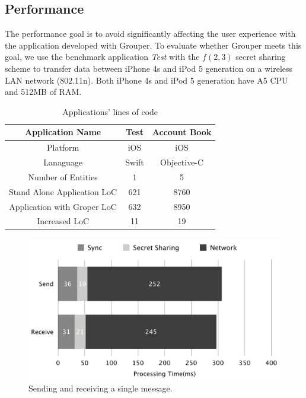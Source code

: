 \documentclass[twocolumn,10pt]{article}
\begin{document}
\subsection{Performance}

The performance goal is to avoid significantly affecting the user experience with the application developed with Grouper. 
To evaluate whether Grouper meets this goal, we use the benchmark application \emph{Test} with the $f(2, 3)$ secret sharing scheme to transfer data between iPhone 4s and iPod 5 generation on a wireless LAN network (802.11n). 
Both iPhone 4s and iPod 5 generation have A5 CPU and 512MB of RAM.

\begin{table}[t]
	\footnotesize
	\centering  
	\caption{Applications' lines of code}
	\begin{tabular}{c|c|c}
		\hline
		Application Name           & Test  & Account Book \\ \hline
		Platform            & iOS   & iOS          \\ \hline
		Lanaguage           & Swift & Objective-C  \\ \hline
		Number of Entities  & 1     & 5            \\ \hline
		Stand Alone Application LoC     & 621   & 8760         \\ \hline
		Application with Groper LoC     & 632   & 8950         \\ \hline
		Increased LoC & 11    & 19           \\ \hline
	\end{tabular}
\end{table}

\begin{figure}[t]
	\centering
	\includegraphics[scale=0.12]{processing1}
	\caption{Sending and receiving a single message.}
\end{figure}
\end{document}
